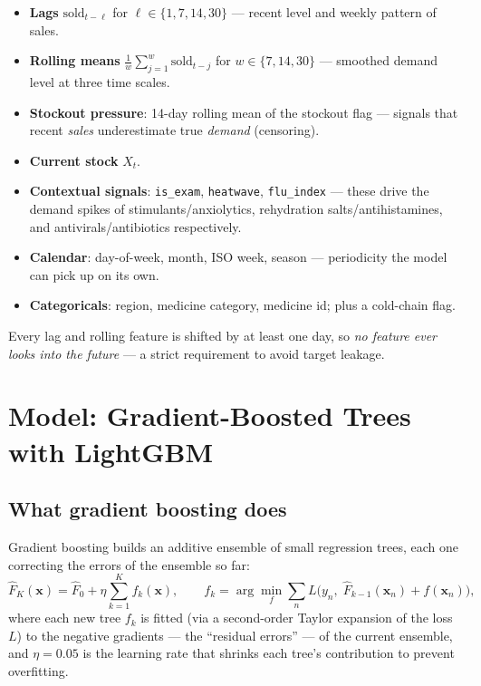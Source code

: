 \documentclass[11pt,a4paper]{article}
\begin{document}
\begin{itemize}
  \item \textbf{Lags} $\text{sold}_{t-\ell}$ for $\ell \in \{1, 7, 14, 30\}$ --- recent level and weekly pattern of sales.
  \item \textbf{Rolling means} $\frac{1}{w}\sum_{j=1}^{w}\text{sold}_{t-j}$ for $w \in \{7, 14, 30\}$ --- smoothed demand level at three time scales.
  \item \textbf{Stockout pressure}: 14-day rolling mean of the stockout flag --- signals that recent \emph{sales} underestimate true \emph{demand} (censoring).
  \item \textbf{Current stock} $X_t$.
  \item \textbf{Contextual signals}: \texttt{is\_exam}, \texttt{heatwave}, \texttt{flu\_index} --- these drive the demand spikes of stimulants/anxiolytics, rehydration salts/antihistamines, and antivirals/antibiotics respectively.
  \item \textbf{Calendar}: day-of-week, month, ISO week, season --- periodicity the model can pick up on its own.
  \item \textbf{Categoricals}: region, medicine category, medicine id; plus a cold-chain flag.
\end{itemize}

Every lag and rolling feature is shifted by at least one day, so \emph{no feature ever looks into the future} --- a strict requirement to avoid target leakage.

\section{Model: Gradient-Boosted Trees with LightGBM}

\subsection{What gradient boosting does}
Gradient boosting builds an additive ensemble of small regression trees, each one correcting the errors of the ensemble so far:
\begin{equation}
\widehat{F}_K(\mathbf{x}) = \widehat{F}_0 + \eta \sum_{k=1}^{K} f_k(\mathbf{x}),
\qquad
f_k = \arg\min_{f} \sum_{n} L\bigl(y_n,\; \widehat{F}_{k-1}(\mathbf{x}_n) + f(\mathbf{x}_n)\bigr),
\end{equation}
where each new tree $f_k$ is fitted (via a second-order Taylor expansion of the loss $L$) to the negative gradients --- the ``residual errors'' --- of the current ensemble, and $\eta = 0.05$ is the learning rate that shrinks each tree's contribution to prevent overfitting.
\end{document}
